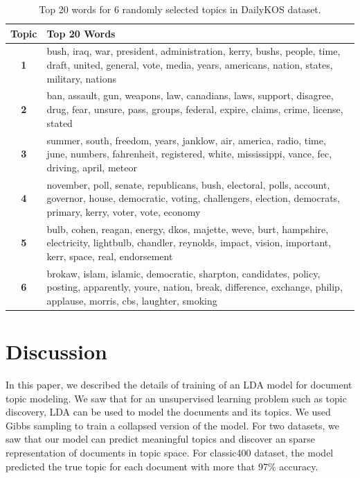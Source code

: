 \documentclass[twoside,12pt]{article}
\begin{document}
\begin{table}[!]
\begin{center}
\begin{tabular}{| c | p{12cm} |}
\hline
\textbf{Topic}& \textbf{Top 20 Words}  \\ \hline
\textbf{1}&bush, iraq, war, president, administration, kerry, bushs, people, time, draft, united, general, vote, media, years, americans, nation, states, military, nations\\ \hline
\textbf{2}& ban, assault, gun, weapons, law, canadians, laws, support, disagree, drug, fear, unsure, pass, groups, federal, expire, claims, crime, license, stated
\\
 \hline
\textbf{3}&summer, south, freedom, years, janklow, air, america, radio, time, june, numbers, fahrenheit, registered, white, mississippi, vance, fec, driving, april, meteor\\
 \hline

\textbf{4}&november, poll, senate, republicans, bush, electoral, polls, account, governor, house, democratic, voting, challengers, election, democrats, primary, kerry, voter, vote, economy
\\
 \hline

\textbf{5} &  bulb, cohen, reagan, energy, dkos, majette, weve,
 burt, hampshire, electricity, lightbulb, chandler,
 reynolds, impact, vision, important, kerr, space,
 real, endorsement
\\
 \hline

\textbf{6} &  brokaw, islam, islamic, democratic, sharpton,
 candidates, policy, posting, apparently, youre, nation,
 break, difference, exchange, philip, applause, morris,
 cbs, laughter, smoking
\\
 \hline
 
 
 
\end{tabular}
\caption{Top 20 words for 6 randomly selected topics in DailyKOS dataset.}
\label{tableDKTopWords}
\end{center}
\end{table}


\section{Discussion}
In this paper, we described the details of training of an LDA model for document topic modeling. We saw that for an unsupervised learning problem such as topic discovery, LDA can be used to model the documents and its topics. We used Gibbs sampling to train a collapsed version of the model. For two datasets, we saw that our model can predict meaningful topics and discover an sparse representation of documents in topic space. For classic400 dataset, the model predicted the true topic for each document with more that 97\% accuracy.
\end{document}
